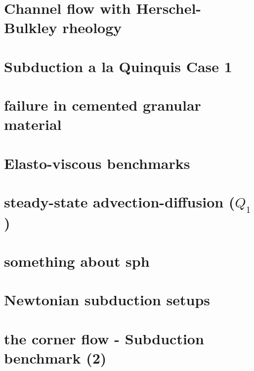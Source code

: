 \documentclass[a4paper,11pt]{report}
\begin{document}
\chapter{Channel flow with Herschel-Bulkley rheology \label{f61}} 

\chapter{Subduction a la Quinquis Case 1 \label{f62}} 

\chapter{failure in cemented granular material \label{f63}} 

\chapter{Elasto-viscous benchmarks \label{f64}} 

\chapter{steady-state advection-diffusion ($Q_1$) \label{f65}} 

\chapter{something about sph \label{f66}} 

\chapter{Newtonian subduction setups \label{f67}} 

\chapter{the corner flow - Subduction benchmark (2) \label{f68}} 
\end{document}
